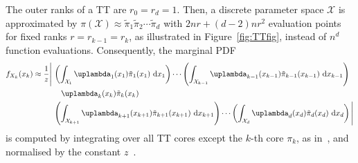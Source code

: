 The outer ranks of a TT are $r_0 = r_d = 1$.
Then, a discrete parameter space $\mathcal{X}$ is approximated by $\pi(\mathcal{X})\approx \tilde{\pi}_1  \tilde{\pi}_2  \cdots \tilde{\pi}_d$ with $2nr + (d-2)nr^2$ evaluation points for fixed ranks $r =r_{k-1} = r_k $, as illustrated in Figure~\ref{fig:TTfig}, instead of $n^d$ function evaluations.
Consequently, the marginal PDF
\begin{align}
	\begin{split}
		f_{X_k}(x_k) \approx \frac{1}{z} \Bigg|\, 
		&\left( \int_{\mathcal{X}_1} \uplambda_1(x_1) \tilde{\pi}_1(x_1) \, \diff x_1 \right) \cdots 
		\left( \int_{\mathcal{X}_{k-1}} \uplambda_{k-1}(x_{k-1}) \tilde{\pi}_{k-1}(x_{k-1}) \, \diff x_{k-1} \right) \\
		&\quad \uplambda_k(x_k) \tilde{\pi}_k(x_k) \\
		& \left( \int_{\mathcal{X}_{k+1}} \uplambda_{k+1}(x_{k+1}) \tilde{\pi}_{k+1}(x_{k+1}) \,\diff x_{k+1} \right) \cdots 
		\left( \int_{\mathcal{X}_{d}} \uplambda_d(x_d) \tilde{\pi}_d(x_d) \, \diff x_d \right)
		\Bigg| 
	\end{split}
\end{align}
is computed by integrating over all TT cores except the $k$-th core $\pi_k$, as in~\cite{dolgov2020approximation}, and normalised by the constant $z$~\cite{cui2022deep}.


